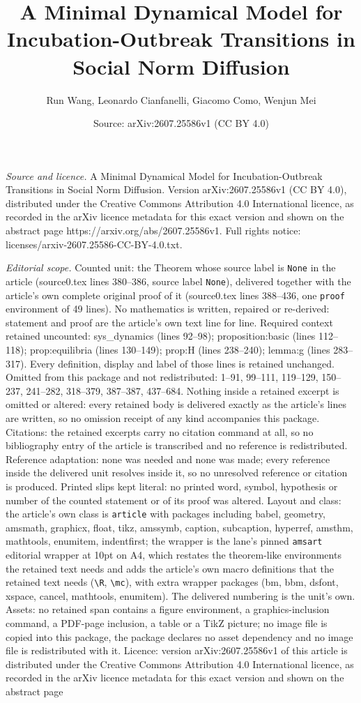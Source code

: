 \documentclass[10pt,a4paper]{amsart}
\title[A Minimal Dynamical Model for Incubation-Outbreak Transition]{A Minimal Dynamical Model for Incubation-Outbreak Transitions in Social Norm Diffusion}
\author{Run Wang, Leonardo Cianfanelli, Giacomo Como, Wenjun Mei}
\date{Source: arXiv:2607.25586v1 (CC BY 4.0)}
\begin{document}
\maketitle

\noindent\emph{Source and licence.} A Minimal Dynamical Model for Incubation-Outbreak Transitions in Social Norm Diffusion. Version arXiv:2607.25586v1 (CC BY 4.0), distributed under the Creative Commons Attribution 4.0 International licence, as recorded in the arXiv licence metadata for this exact version and shown on the abstract page https://arxiv.org/abs/2607.25586v1. Full rights notice: licenses/arxiv-2607.25586-CC-BY-4.0.txt.\par\smallskip

\noindent\textit{Editorial scope.} Counted unit: the Theorem whose source label is \texttt{None} in the article (source0.tex lines 380--386, source label \texttt{None}), delivered together with the article's own complete original proof of it (source0.tex lines 388--436, one \texttt{proof} environment of 49 lines). No mathematics is written, repaired or re-derived: statement and proof are the article's own text line for line. Required context retained uncounted: sys\_dynamics (lines 92--98); proposition:basic (lines 112--118); prop:equilibria (lines 130--149); prop:H (lines 238--240); lemma:g (lines 283--317). Every definition, display and label of those lines is retained unchanged. Omitted from this package and not redistributed: 1--91, 99--111, 119--129, 150--237, 241--282, 318--379, 387--387, 437--684. Nothing inside a retained excerpt is omitted or altered: every retained body is delivered exactly as the article's lines are written, so no omission receipt of any kind accompanies this package. Citations: the retained excerpts carry no citation command at all, so no bibliography entry of the article is transcribed and no reference is redistributed. Reference adaptation: none was needed and none was made; every reference inside the delivered unit resolves inside it, so no unresolved reference or citation is produced. Printed slips kept literal: no printed word, symbol, hypothesis or number of the counted statement or of its proof was altered. Layout and class: the article's own class is \texttt{article} with packages including babel, geometry, amsmath, graphicx, float, tikz, amssymb, caption, subcaption, hyperref, amsthm, mathtools, enumitem, indentfirst; the wrapper is the lane's pinned \texttt{amsart} editorial wrapper at 10pt on A4, which restates the theorem-like environments the retained text needs and adds the article's own macro definitions that the retained text needs (\texttt{\textbackslash R}, \texttt{\textbackslash mc}), with extra wrapper packages (bm, bbm, dsfont, xspace, cancel, mathtools, enumitem). The delivered numbering is the unit's own. Assets: no retained span contains a figure environment, a graphics-inclusion command, a PDF-page inclusion, a table or a TikZ picture; no image file is copied into this package, the package declares no asset dependency and no image file is redistributed with it. Licence: version arXiv:2607.25586v1 of this article is distributed under the Creative Commons Attribution 4.0 International licence, as recorded in the arXiv licence metadata for this exact version and shown on the abstract page 
\end{document}
